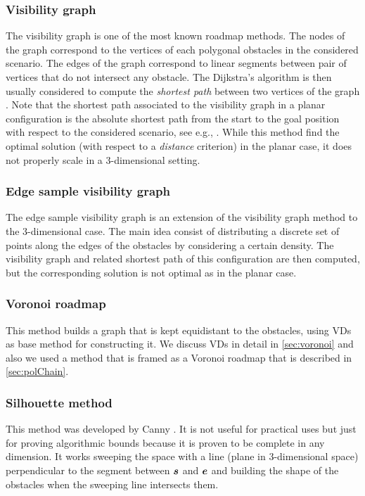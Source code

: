 \documentclass[dissertation.tex]{subfiles}
\begin{document}
\subsubsection{Visibility graph}
The visibility graph is one of the most known roadmap methods. The
nodes of the graph correspond to the vertices of each polygonal
obstacles in the considered scenario. The edges of the graph
correspond to linear segments between pair of vertices that do not
intersect any obstacle. The Dijkstra's algorithm is then usually
considered to compute the \emph{shortest path} between two vertices of
the graph \cite{dijkstra}.  Note
that the shortest path associated to the visibility graph in a planar
configuration is the absolute shortest path from the start to the goal
position with respect to the considered scenario, see e.g.,
\cite{deberg}. While this method find the optimal solution (with respect to a
\emph{distance} criterion) in the planar case, it does not properly
scale in a 3-dimensional setting.

\subsubsection{Edge sample visibility graph}
The edge sample visibility graph is an extension of the visibility
graph method to the 3-dimensional case. The main idea consist of
distributing a discrete set of points along the edges of the obstacles
by considering  a certain density. The visibility graph and related
shortest path of this configuration are then computed, but the
corresponding solution is not optimal as in the planar case.

\subsubsection{Voronoi roadmap}
This method builds a graph that is kept equidistant to the obstacles,
using
\acp{VD} as base method for constructing it. We discuss \acp{VD}
in detail in \cref{sec:voronoi} and also we used a method that is
framed as a Voronoi roadmap that is described in \cref{sec:polChain}.

\subsubsection{Silhouette method}
This method was developed by Canny \cite{canny}. It is not useful for
practical uses but just for
proving algorithmic bounds because it is proven to be complete in any
dimension. It works sweeping the space with a line (plane in
3-dimensional space) perpendicular to the
segment between $\boldsymbol{s}$ and $\boldsymbol{e}$ and building the shape of the
obstacles when the sweeping line intersects them.
\end{document}
